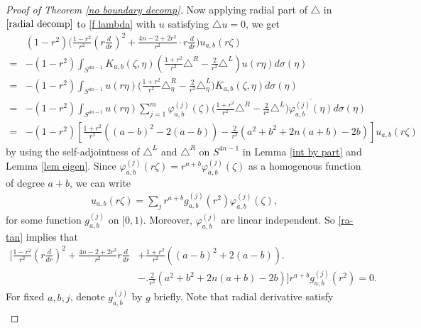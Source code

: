 \documentclass[a4paper,11pt]{amsart}
\numberwithin{equation}{section}
\begin{document}
\begin{proof}[Proof of Theorem \ref{no boundary decomp}]
  Now applying radial part of $\triangle$ in $\eqref{radial decomp}$ to \eqref{f lambda} with $u$ satisfying $\triangle u=0$, we get
\begin{equation}\begin{aligned}\label{ra-tan}
&(1-r^2)\bigg(\frac{1-r^2}{r^2}\left(r\frac{d}{dr} \right)^2 +\frac{4n-2+2r^2}{r^2}\cdot r\frac{d}{dr}\bigg)u_{a,b}(r\zeta)\\
=&-(1-r^2)\int_{S^{4n-1}}K_{a,b}(\zeta,\eta)\left(\frac{1+r^2}{r^2}\triangle^R-\frac{2}{r^2}\triangle^L\right)u(r\eta)d\sigma(\eta)\\
=&-(1-r^2)\int_{S^{4n-1}}u(r\eta)\bigg(\frac{1+r^2}{r^2}\triangle^R_{\eta}-\frac{2}{r^2}\triangle^L_{\eta}\bigg)K_{a,b}(\zeta,\eta)d\sigma(\eta)\\
=&-(1-r^2)\int_{S^{4n-1}}u(r\eta)\sum_{j=1}^{m}\varphi_{a,b}^{(j)}(\zeta)\bigg( \frac{1+r^2}{r^2}\triangle^R-\frac{2}{r^2}\triangle^L\bigg)\overline{\varphi_{a,b}^{(j)}(\eta)}d\sigma(\eta)\\
=&-(1-r^2)\left[\frac{1+r^2}{r^2}\left((a-b)^2-2(a-b)\right)-\frac{2}{r^2}\left(a^2+b^2+2n(a+b)-2b\right)\right]u_{a,b}(r\zeta)
\end{aligned}\end{equation}
by using the self-adjointness of $\triangle^L$ and $\triangle^R$ on $S^{4n-1}$ in Lemma \ref{int by part} and Lemma \ref{lem eigen}. Since $\varphi_{a,b}^{(j)}(r\zeta)=r^{a+b}\varphi_{a,b}^{(j)}(\zeta)$ as a homogenous function of degree $a+b$, we can write
\begin{equation}\begin{aligned}\label{varphi ab}
u_{a,b}(r\zeta)=\sum_jr^{a+b}g_{a,b}^{(j)}(r^2)\varphi_{a,b}^{(j)}(\zeta),
\end{aligned}\end{equation}
for some function $g_{a,b}^{(j)}$ on $[0,1)$.
Moreover, $\varphi_{a,b}^{(j)}$ are linear independent. So \eqref{ra-tan} implies that
\begin{equation}\begin{aligned}\label{eq decom}
\bigg[\frac{1-r^2}{r^2}\left(r\frac{d}{dr} \right)^2 + \frac{4n-2+2r^2}{r^2} r\frac{d}{dr}&+\frac{1+r^2}{r^2}\left((a-b)^2+2(a-b)\right)\bigg.\\
&- \bigg.\frac{2}{r^2}\left(a^2+b^2+2n(a+b)-2b\right)\bigg]r^{a+b}g_{a,b}^{(j)}(r^2)=0.
\end{aligned}\end{equation}
For fixed $a,b,j$, denote $g_{a,b}^{(j)}$ by $g$ briefly. Note that radial derivative satisfy
\begin{equation}\begin{aligned}\label{radial derivatives}

\end{aligned}
\end{equation}
\end{proof}
\end{document}
